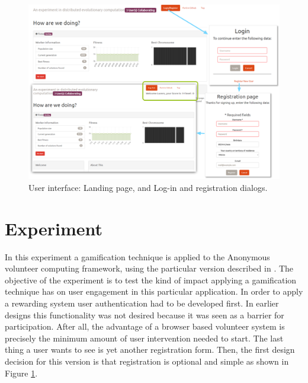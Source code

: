 \documentclass{llncs}
\begin{document}
\begin{figure}[htb]
    \centering
        \includegraphics[width=5in]{img/login.png}
    \caption{ User interface: Landing page, and Log-in and registration dialogs.
    }
    \label{fig:login}
\end{figure}

\section{Experiment}
\label{sec:experiments}

In this experiment a gamification technique is applied to
the Anonymous
volunteer computing framework, using the
particular version described in \cite{DBLP:conf/gecco/MereloCGCRV16,2016arXiv160101607M}.
The objective of the experiment is to test the kind of impact
applying a gamification technique has on user engagement in this
particular application. In order to apply a rewarding system
user authentication had to be developed first. In earlier designs
this functionality was not desired because it was seen as a barrier
for participation. After all, the advantage of a browser based volunteer system
is precisely the minimum amount of user intervention needed to start.
The last thing a user wants to see is yet another registration form.
Then, the first design decision for this version is that registration is optional and simple as shown in Figure \ref{fig:login}.
\end{document}
